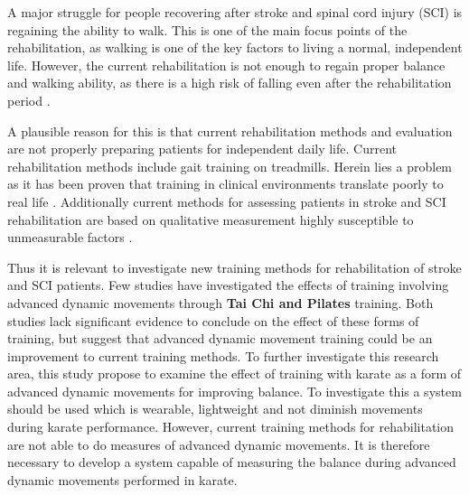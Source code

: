 
A major struggle for people recovering after stroke and spinal cord injury (SCI) is regaining the ability to walk. This is one of the main focus points of the rehabilitation, as walking is one of the key factors to living a normal, independent life. However, the current rehabilitation is not enough to regain proper balance and walking ability, as there is a high risk of falling even after the rehabilitation period \cite{Blennerhassett2012, Hanger2014, Wannapakhe2015, Wong2016, Bhalla2016}.

A plausible reason for this is that current rehabilitation methods and evaluation are not properly preparing patients for independent daily life. Current rehabilitation methods include gait training on treadmills. Herein lies a problem as it has been proven that training in clinical environments translate poorly to real life \cite{Basteris2014}. Additionally current methods for assessing patients in stroke and SCI rehabilitation are based on qualitative measurement highly susceptible to unmeasurable factors \cite{Wang2010, ANPT_SCI2018, ANPT_Stroke2018}. 

Thus it is relevant to investigate new training methods for rehabilitation of stroke and SCI patients. Few studies \cite{Winser2018, Moreno2017} have investigated the effects of training involving advanced dynamic movements through \textbf{Tai Chi and Pilates} training. Both studies lack significant evidence to conclude on the effect of these forms of training, but suggest that advanced dynamic movement training could be an improvement to current training methods. 
To further investigate this research area, this study propose to examine the effect of training with karate as a form of advanced dynamic movements for improving balance. 
To investigate this a system should be used which is wearable, lightweight and not diminish movements during karate performance. However, current training methods for rehabilitation are not able to do measures of advanced dynamic movements. It is therefore necessary to develop a system capable of measuring the balance during advanced dynamic movements performed in karate. 

